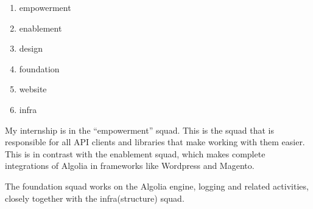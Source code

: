 \begin{enumerate}
  \item empowerment
  \item enablement
  \item design
  \item foundation
  \item website
  \item infra
\end{enumerate}

My internship is in the ``empowerment'' squad. This is the squad that is responsible for all API clients and libraries that make working with them easier. This is in contrast with the enablement squad, which makes complete integrations of Algolia in frameworks like Wordpress\cite{algolia-wordpress} and Magento\cite{algolia-magento}.

The foundation squad works on the Algolia engine, logging and related activities, closely together with the infra(structure) squad.

